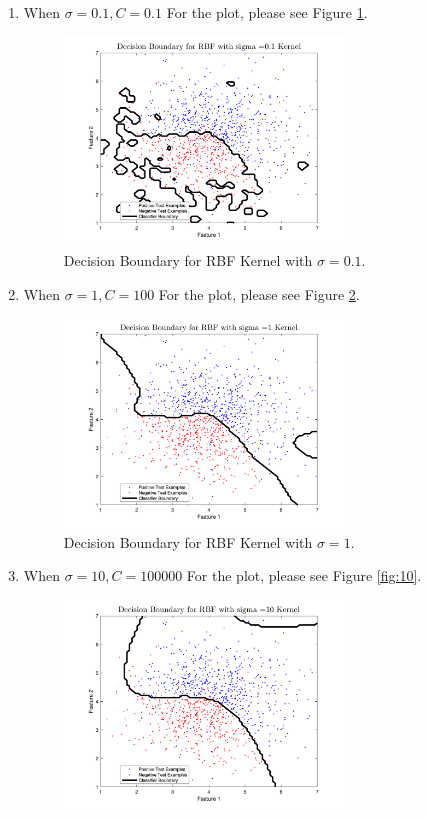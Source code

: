 \documentclass[english]{article}
\begin{document}
\begin{enumerate}
\begin{enumerate}
\item When $\boxed{\sigma = 0.1, C = 0.1}$ For the plot, please see Figure \ref{fig:01}.\\
        \begin{figure}[H]
          \centering
          \includegraphics[width=0.7\textwidth]{01.png}
          \caption{Decision Boundary for RBF Kernel with $\sigma = 0.1$.}
          \label{fig:01}
        \end{figure}
\item When $\boxed{\sigma = 1, C = 100}$ For the plot, please see Figure \ref{fig:1}.\\
        \begin{figure}[H]
          \centering
          \includegraphics[width=0.7\textwidth]{1.png}
          \caption{Decision Boundary for RBF Kernel with $\sigma = 1$.}
          \label{fig:1}
        \end{figure}
        \clearpage
\item When $\boxed{\sigma = 10, C = 100000}$ For the plot, please see Figure \ref{fig:10}.\\
        \begin{figure}[H]
          \centering
          \includegraphics[width=0.7\textwidth]{10.png}

\end{figure}
\end{enumerate}
\end{enumerate}
\end{document}

